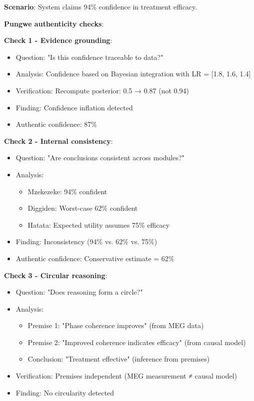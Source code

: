 \begin{example}
\textbf{Scenario}: System claims 94\% confidence in treatment efficacy.

\textbf{Pungwe authenticity checks}:

\textbf{Check 1 - Evidence grounding}:
\begin{itemize}
\item Question: "Is this confidence traceable to data?"
\item Analysis: Confidence based on Bayesian integration with LR = [1.8, 1.6, 1.4]
\item Verification: Recompute posterior: 0.5 → 0.87 (not 0.94)
\item Finding: Confidence inflation detected
\item Authentic confidence: 87\%
\end{itemize}

\textbf{Check 2 - Internal consistency}:
\begin{itemize}
\item Question: "Are conclusions consistent across modules?"
\item Analysis:
    \begin{itemize}
    \item Mzekezeke: 94\% confident
    \item Diggiden: Worst-case 62\% confident
    \item Hatata: Expected utility assumes 75\% efficacy
    \end{itemize}
\item Finding: Inconsistency (94\% vs. 62\% vs. 75\%)
\item Authentic confidence: Conservative estimate = 62\%
\end{itemize}

\textbf{Check 3 - Circular reasoning}:
\begin{itemize}
\item Question: "Does reasoning form a circle?"
\item Analysis: 
    \begin{itemize}
    \item Premise 1: "Phase coherence improves" (from MEG data)
    \item Premise 2: "Improved coherence indicates efficacy" (from causal model)
    \item Conclusion: "Treatment effective" (inference from premises)
    \end{itemize}
\item Verification: Premises independent (MEG measurement ≠ causal model)
\item Finding: No circularity detected
\end{itemize}


\end{example}
